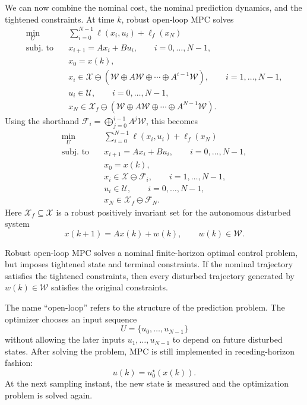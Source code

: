 We can now combine the nominal cost, the nominal prediction dynamics, and the tightened
constraints. At time \(k\), robust open-loop MPC solves
\[
\begin{aligned}
    \min_{U}\quad
    &
    \sum_{i=0}^{N-1}\ell(x_i,u_i)+\ell_f(x_N)
    \\
    \text{subj. to}\quad
    &
    x_{i+1}=Ax_i+Bu_i,
    \qquad i=0,\ldots,N-1,
    \\
    &
    x_0=x(k),
    \\
    &
    x_i\in
    \mathcal X
    \ominus
    \left(
        \mathcal W\oplus A\mathcal W\oplus\cdots\oplus A^{i-1}\mathcal W
    \right),
    \qquad i=1,\ldots,N-1,
    \\
    &
    u_i\in\mathcal U,
    \qquad i=0,\ldots,N-1,
    \\
    &
    x_N\in
    \mathcal X_f
    \ominus
    \left(
        \mathcal W\oplus A\mathcal W\oplus\cdots\oplus A^{N-1}\mathcal W
    \right).
\end{aligned}
\]
Using the shorthand \(\mathcal F_i=\bigoplus_{j=0}^{i-1}A^j\mathcal W\), this becomes
\[
\begin{aligned}
    \min_{U}\quad
    &
    \sum_{i=0}^{N-1}\ell(x_i,u_i)+\ell_f(x_N)
    \\
    \text{subj. to}\quad
    &
    x_{i+1}=Ax_i+Bu_i,
    \qquad i=0,\ldots,N-1,
    \\
    &
    x_0=x(k),
    \\
    &
    x_i\in\mathcal X\ominus\mathcal F_i,
    \qquad i=1,\ldots,N-1,
    \\
    &
    u_i\in\mathcal U,
    \qquad i=0,\ldots,N-1,
    \\
    &
    x_N\in\mathcal X_f\ominus\mathcal F_N.
\end{aligned}
\]
Here \(\mathcal X_f\subseteq\mathcal X\) is a robust positively invariant set for the autonomous
disturbed system
\[
    x(k+1)=Ax(k)+w(k),
    \qquad w(k)\in\mathcal W.
\]

\begin{theorembox}
Robust open-loop MPC solves a nominal finite-horizon optimal control problem, but imposes
tightened state and terminal constraints. If the nominal trajectory satisfies the tightened
constraints, then every disturbed trajectory generated by \(w(k)\in\mathcal W\) satisfies the
original constraints.
\end{theorembox}

The name ``open-loop'' refers to the structure of the prediction problem. The optimizer chooses
an input sequence
\[
    U=\{u_0,\ldots,u_{N-1}\}
\]
without allowing the later inputs \(u_1,\ldots,u_{N-1}\) to depend on future disturbed states.
After solving the problem, MPC is still implemented in receding-horizon fashion:
\[
    u(k)=u_0^\star(x(k)).
\]
At the next sampling instant, the new state is measured and the optimization problem is solved
again.

